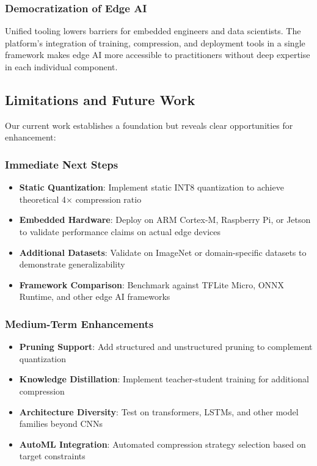 \subsubsection{Democratization of Edge AI}
Unified tooling lowers barriers for embedded engineers and data scientists. The platform's integration of training, compression, and deployment tools in a single framework makes edge AI more accessible to practitioners without deep expertise in each individual component.

\subsection{Limitations and Future Work}

Our current work establishes a foundation but reveals clear opportunities for enhancement:

\subsubsection{Immediate Next Steps}
\begin{itemize}
\item \textbf{Static Quantization}: Implement static INT8 quantization to achieve theoretical 4$\times$ compression ratio
\item \textbf{Embedded Hardware}: Deploy on ARM Cortex-M, Raspberry Pi, or Jetson to validate performance claims on actual edge devices
\item \textbf{Additional Datasets}: Validate on ImageNet or domain-specific datasets to demonstrate generalizability
\item \textbf{Framework Comparison}: Benchmark against TFLite Micro, ONNX Runtime, and other edge AI frameworks
\end{itemize}

\subsubsection{Medium-Term Enhancements}
\begin{itemize}
\item \textbf{Pruning Support}: Add structured and unstructured pruning to complement quantization
\item \textbf{Knowledge Distillation}: Implement teacher-student training for additional compression
\item \textbf{Architecture Diversity}: Test on transformers, LSTMs, and other model families beyond CNNs
\item \textbf{AutoML Integration}: Automated compression strategy selection based on target constraints
\end{itemize}

